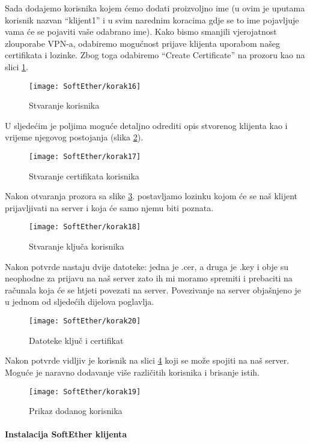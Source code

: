 \FloatBarrier
Sada dodajemo korisnika kojem ćemo dodati proizvoljno ime (u ovim je uputama korisnik nazvan ``klijent1'' i u svim narednim koracima gdje se to ime pojavljuje vama će se pojaviti vaše odabrano ime). Kako bismo smanjili vjerojatnost zlouporabe VPN-a, odabiremo mogućnost prijave klijenta uporabom našeg certifikata i lozinke. Zbog toga odabiremo ``Create Certificate'' na prozoru kao na slici \ref{fig:create-soft}.
\begin{figure}[h!]
     \centering
     \texttt{[image: SoftEther/korak16]}
     \caption{Stvaranje korisnika}
     \label{fig:create-soft}
\end{figure}
\FloatBarrier
U sljedećim je poljima moguće detaljno odrediti opis stvorenog klijenta kao i vrijeme njegovog postojanja (slika \ref{fig:userca-soft}).
\begin{figure}[h!]
     \centering
     \texttt{[image: SoftEther/korak17]}
     \caption{Stvaranje certifikata korisnika}
     \label{fig:userca-soft}
\end{figure}
\FloatBarrier
Nakon otvaranja prozora sa slike \ref{fig:key-soft}. postavljamo lozinku kojom će se naš klijent prijavljivati na server i koja će samo njemu biti poznata.
\begin{figure}[h!]
     \centering
     \texttt{[image: SoftEther/korak18]}
     \caption{Stvaranje ključa korisnika}
     \label{fig:key-soft}
\end{figure}
\FloatBarrier
Nakon potvrde nastaju dvije datoteke: jedna je .cer, a druga je .key i obje su neophodne za prijavu na naš server zato ih mi moramo spremiti i prebaciti na računala koja će se htjeti povezati na server. Povezivanje na server objašnjeno je u jednom od sljedećih dijelova poglavlja.
\begin{figure}[h!]
     \centering
     \texttt{[image: SoftEther/korak20]}
     \caption{Datoteke ključ i certifikat}
\end{figure}
\FloatBarrier
Nakon potvrde vidljiv je korisnik na slici \ref{fig:new-soft} koji se može spojiti na naš server. Moguće je naravno dodavanje više različitih korisnika i brisanje istih.
\begin{figure}[h!]
     \centering
     \texttt{[image: SoftEther/korak19]}
     \caption{Prikaz dodanog korisnika}
     \label{fig:new-soft}
\end{figure}
\FloatBarrier
\newpage
\paragraph*{Instalacija SoftEther klijenta}

